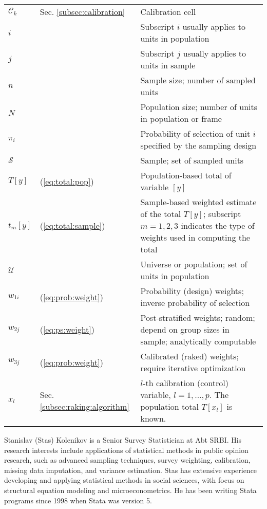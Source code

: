 \begin{tabular}{llp{9.5cm}}
    $\mathcal{C}_k$ & Sec. \ref{subsec:calibration} & Calibration cell \\ 
    $i$ & & Subscript $i$ usually applies to units in population \\
    $j$ & & Subscript $j$ usually applies to units in sample \\
    $n$ & & Sample size; number of sampled units \\
    $N$ & & Population size; number of units in population or frame \\
    $\pi_i$ & & Probability of selection of unit $i$ 
            specified by the sampling design \\
%
    $\mathcal{S}$ & & Sample; set of sampled units \\
    $T[y]$ & (\ref{eq:total:pop}) & Population-based total of variable $[y]$ \\
    $t_m[y]$ & (\ref{eq:total:sample}) & Sample-based weighted estimate of the total
        $T[y]$; subscript $m=1,2,3$ indicates the type of weights used in computing
        the total \\
    $\mathcal{U}$ & & Universe or population; set of units in population \\
%    
    $w_{1i}$ & (\ref{eq:prob:weight}) & Probability (design) weights; 
        inverse probability of selection \\
    $w_{2j}$ & (\ref{eq:ps:weight}) & Post-stratified weights;
        random; depend on group sizes in sample; analytically computable \\
    $w_{3j}$ & (\ref{eq:prob:weight}) & Calibrated (raked) weights;
        require iterative optimization \\
%
    $x_l$ & Sec. \ref{subsec:raking:algorithm} & $l$-th calibration (control)
        variable, $l=1,\ldots,p$. The population total $T[x_l]$ is known. \\
\end{tabular}

\begin{aboutauthor}
  Stanislav (Stas) Kolenikov is a Senior Survey Statistician at Abt SRBI.
  His research interests include
  applications of statistical methods in public opinion research,
  such as advanced sampling techniques, survey weighting,
  calibration, missing data imputation, and variance estimation.
  Stas has extensive experience developing and applying
  statistical methods in social sciences, with focus on structural equation
  modeling and microeconometrics. He has been writing Stata programs since
  1998 when Stata was version 5.
\end{aboutauthor}
